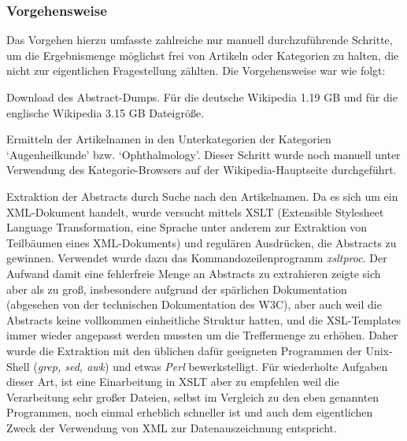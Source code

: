 \documentclass[pagesize,DIV=calc,12pt,draft]{scrreprt}
\begin{document}
\subsubsection{Vorgehensweise}

Das Vorgehen hierzu umfasste zahlreiche nur manuell durchzuführende
Schritte, um die Ergebnismenge möglichst frei von Artikeln oder
Kategorien zu halten, die nicht zur eigentlichen Fragestellung zählten. Die Vorgehensweise war wie folgt:

\begin{inparaenum}
\item Download des Abstract-Dumps. Für die deutsche Wikipedia 1.19 GB und
  für die englische Wikipedia 3.15 GB Dateigröße.

\item Ermitteln der Artikelnamen in den Unterkategorien der Kategorien
  `Augenheilkunde' bzw. `Ophthalmology'. Dieser Schritt wurde noch
  manuell unter Verwendung des Kategorie-Browsers auf der
  Wikipedia-Hauptseite durchgeführt.

\item Extraktion der Abstracts durch Suche nach den Artikelnamen. Da es sich um ein XML-Dokument handelt, wurde versucht mittels XSLT (Extensible
  Stylesheet Language Transformation, eine Sprache unter anderem zur Extraktion von Teilbäumen eines XML-Dokuments) und regulären Ausdrücken, die
  Abstracts zu gewinnen. Verwendet wurde dazu das Kommandozeilenprogramm
  \emph{xsltproc}. Der Aufwand damit eine fehlerfreie Menge an Abstracts zu
  extrahieren zeigte sich aber als zu groß, insbesondere aufgrund der
  spärlichen Dokumentation (abgesehen von der technischen Dokumentation
  des W3C), aber auch weil die Abstracts keine vollkommen einheitliche
  Struktur hatten, und die XSL-Templates immer wieder angepasst werden
  mussten um die Treffermenge zu erhöhen. Daher wurde die Extraktion mit
  den üblichen dafür geeigneten Programmen der Unix-Shell (\emph{grep, sed,
  awk}) und etwas \emph{Perl} bewerkstelligt. Für wiederholte Aufgaben dieser
  Art, ist eine Einarbeitung in XSLT aber zu empfehlen weil die
  Verarbeitung sehr großer Dateien, selbst im Vergleich zu den eben
  genannten Programmen, noch einmal erheblich schneller ist und auch dem
  eigentlichen Zweck der Verwendung von XML zur Datenauszeichnung
  entspricht.


\end{inparaenum}
\end{document}
